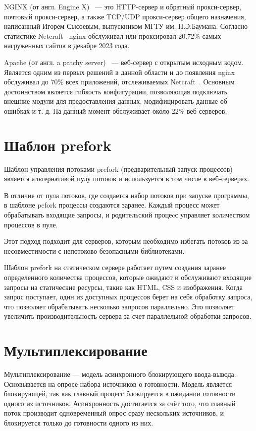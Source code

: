 NGINX (от англ. Engine X)~\cite{nginx} --- это HTTP-сервер и обратный прокси-сервер, почтовый прокси-сервер, а также TCP/UDP прокси-сервер общего назначения, написанный Игорем Сысоевым, выпускником МГТУ им. Н.Э.Баумана. Согласно статистике Netcraft~\cite{netcraft} nginx обслуживал или проксировал 20.72\% самых нагруженных сайтов в декабре 2023 года.

Apache (от англ. a patchy server)~\cite{apache} --- веб-сервер с открытым исходным кодом. Является одним из первых решений в данной области и до появления nginx обслуживал до 70\% всех приложений, отслеживаемых Netcraft~\cite{netcraft}. Основным достоинством является гибкость конфигурации, позволяющая подключать внешние модули для предоставления данных, модифицировать данные об ошибках и т. д. На данный момент обслуживает около 22\% веб-серверов.

\section{Шаблон prefork}

Шаблон управления потоками prefork (предварительный запуск процессов) является альтернативой пулу потоков и используется в том числе в веб-серверах.

В отличие от пула потоков, где создается набор потоков при запуске программы, в шаблоне pefork процессы создаются заранее. Каждый процесс может обрабатывать входящие запросы, и родительский процеcс управляет количеством процессов в пуле. 

Этот подход подходит для серверов, которым необходимо избегать потоков из-за несовместимости с непотоково-безопасными библиотеками.

Шаблон prefork на статическом сервере работает путем создания заранее определенного количества процессов, которые ожидают и обслуживают входящие запросы на статические ресурсы, такие как HTML, CSS и изображения. Когда запрос поступает, один из доступных процессов берет на себя обработку запроса, что позволяет обрабатывать несколько запросов параллельно. Это позволяет увеличить производительность сервера за счет параллельной обработки запросов.

\section{Мультиплексирование}

Мультиплексирование --- модель асинхронного блокирующего ввода-вывода. Основывается на опросе набора источников о готовности.
Модель является блокирующей, так как главный процесс блокируется в ожидании готовности одного из источников.
Асинхронность достигается за счёт того, что главный поток производит одновременный опрос сразу нескольких источников, и блокируется только до готовности одного из них.

